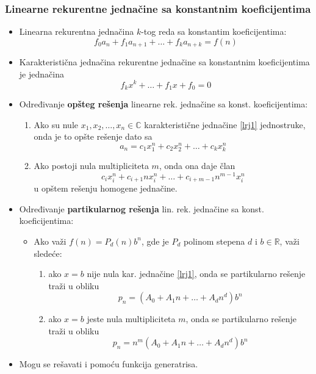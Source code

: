 \documentclass[a4paper,12pt,twoside]{report}
\numberwithin{algorithm}{section}
\begin{document}
\subsubsection{Linearne rekurentne jednačine sa konstantnim koeficijentima}
\begin{itemize}
    \item Linearna rekurentna jednačina $k$-tog reda sa konstantim koeficijentima:
    \[
        f_0a_n + f_1a_{n+1} + \dots + f_ka_{n + k} = f(n)
    \]    
    \item Karakteristična jednačina rekurentne jednačine sa konstantnim koeficijentima je jednačina
    \begin{equation}
        f_kx^k + \dots + f_1x + f_0 = 0
        \label{lrj1}
    \end{equation}
    \item Određivanje \textbf{opšteg rešenja} linearne rek. jednačine sa konst. koeficijentima:
    \begin{enumerate}
        \item Ako su nule $x_1, x_2, \dots, x_n \in \mathbb{C}$ karakteristične jednačine \ref{lrj1} jednostruke,
        onda je to opšte rešenje dato sa
        \[
            a_n = c_1x^n_1 + c_2x^n_2 + \dots + c_kx^n_k
        \]
        \item Ako postoji nula multipliciteta $m$, onda ona daje član 
        \[
            c_ix_i^n + c_{i+1}nx^n_i + \dots + c_{i + m - 1}n^{m - 1}x_i^n
        \]
        u opštem rešenju homogene jednačine.
    \end{enumerate}
    \item Određivanje \textbf{partikularnog rešenja} lin. rek. jednačine sa konst. koeficijentima:
    \begin{itemize}
        \item Ako važi $f(n) = P_d(n)b^n$, gde je $P_d$ polinom stepena $d$ i $b \in \mathbb{R}$, važi sledeće:
        \begin{enumerate}
            \item ako $x = b$ nije nula kar. jednačine \ref{lrj1}, onda se partikularno rešenje traži u obliku
            \[
                p_n = (A_0 + A_1n + \dots + A_dn^d)b^n            
            \]
            \item ako $x = b$ jeste nula multipliciteta $m$, onda se partikularno rešenje traži u obliku
            \[
                p_n = n^m(A_0 + A_1n+\dots + A_dn^d)b^n
            \]
        \end{enumerate}
    \end{itemize}
    \item Mogu se rešavati i pomoću funkcija generatrisa.
    
\end{itemize}
\end{document}
